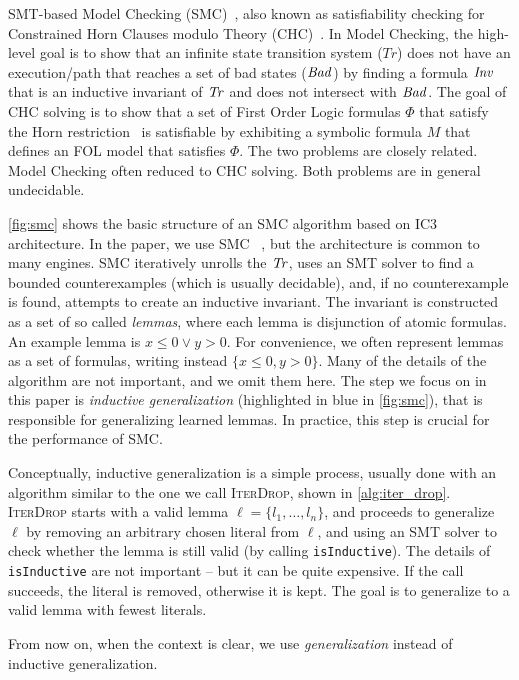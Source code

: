 SMT-based Model Checking (SMC)~\cite{IC3,GPDR,spacer}, also known as
satisfiability checking for Constrained Horn Clauses modulo Theory
(CHC)~\cite{DBLP:conf/birthday/BjornerGMR15}. In Model Checking, the high-level
goal is to show that an infinite state transition system ($Tr$) does not have an
execution/path that reaches a set of bad states ($\mathit{Bad}$) by finding a formula
$\mathit{Inv}$ that is an inductive invariant of $\mathit{Tr}$ and does not intersect with
$\mathit{Bad}$. The goal of CHC solving is to show that a set of First Order Logic
formulas $\Phi$ that satisfy the Horn
restriction~\cite{DBLP:conf/birthday/BjornerGMR15} is satisfiable by exhibiting
a symbolic formula $M$ that defines an FOL model that satisfies $\Phi$. The two
problems are closely related. Model Checking often reduced to CHC solving. Both
problems are in general undecidable.

\cref{fig:smc} shows the basic structure of an SMC algorithm based on IC3
architecture. In the paper, we use SMC \spc~\cite{spacer}, but the architecture is
common to many engines. SMC iteratively unrolls the $\mathit{Tr}$, uses an SMT solver to
find a bounded counterexamples (which is usually decidable), and, if no
counterexample is found, attempts to create an inductive invariant. The
invariant is constructed as a set of so called \emph{lemmas}, where each lemma
is disjunction of atomic formulas. An example lemma is $x \leq 0 \lor y > 0$.
For convenience, we often represent lemmas as a set of formulas, writing instead
$\{x \leq 0,y > 0\}$. Many of the details of the algorithm are not important,
and we omit them here. The step we focus on in this paper is \emph{inductive
  generalization} (highlighted in blue in \cref{fig:smc}), that is responsible
for generalizing learned lemmas. In practice, this step is crucial for the
performance of SMC.

Conceptually, inductive generalization is a simple process, usually done with an
algorithm similar to the one we call \textsc{IterDrop}, shown in
\cref{alg:iter_drop}. \textsc{IterDrop} starts with a valid lemma $\ell = \{l_1,
\ldots, l_n\}$, and proceeds to generalize $\ell$ by removing an arbitrary
chosen literal from $\ell$, and using an SMT solver to check whether the lemma
is still valid (by calling \texttt{isInductive}). 
The details of \texttt{isInductive} are not important -- but it can be quite expensive. If the call succeeds, the literal is removed, otherwise it is kept. The goal is to generalize to a valid lemma with fewest literals.

From now on, when the context is clear, we use \emph{generalization} instead of inductive generalization.

